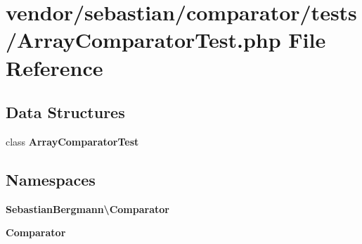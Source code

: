 \section{vendor/sebastian/comparator/tests/\+Array\+Comparator\+Test.php File Reference}
\label{_array_comparator_test_8php}
\subsection*{Data Structures}
\begin{DoxyCompactItemize}
\item 
class {\bf Array\+Comparator\+Test}
\end{DoxyCompactItemize}
\subsection*{Namespaces}
\begin{DoxyCompactItemize}
\item 
 {\bf Sebastian\+Bergmann\textbackslash{}\+Comparator}
\item 
 {\bf Comparator}
\end{DoxyCompactItemize}

